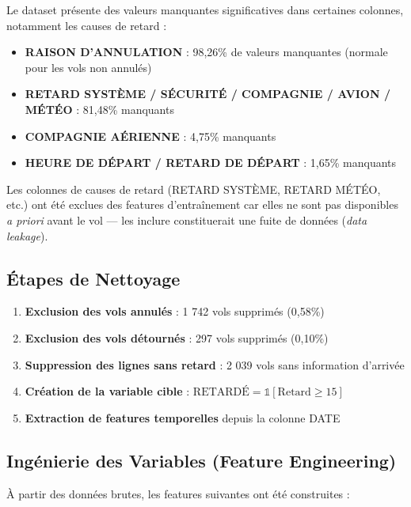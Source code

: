 \documentclass[12pt,a4paper]{article}
\begin{document}
Le dataset présente des valeurs manquantes significatives dans certaines colonnes,
notamment les causes de retard :

\begin{itemize}[leftmargin=*]
  \item \textbf{RAISON D'ANNULATION} : 98,26\% de valeurs manquantes (normale pour les vols non annulés)
  \item \textbf{RETARD SYSTÈME / SÉCURITÉ / COMPAGNIE / AVION / MÉTÉO} : 81,48\% manquants
  \item \textbf{COMPAGNIE AÉRIENNE} : 4,75\% manquants
  \item \textbf{HEURE DE DÉPART / RETARD DE DÉPART} : 1,65\% manquants
\end{itemize}

\begin{warningbox}
  Les colonnes de causes de retard (RETARD SYSTÈME, RETARD MÉTÉO, etc.) ont été 
  exclues des features d'entraînement car elles ne sont pas disponibles \textit{a priori} 
  avant le vol --- les inclure constituerait une fuite de données (\textit{data leakage}).
\end{warningbox}

\subsection{Étapes de Nettoyage}

\begin{enumerate}[leftmargin=*]
  \item \textbf{Exclusion des vols annulés} : 1 742 vols supprimés (0,58\%)
  \item \textbf{Exclusion des vols détournés} : 297 vols supprimés (0,10\%)
  \item \textbf{Suppression des lignes sans retard} : 2 039 vols sans information d'arrivée
  \item \textbf{Création de la variable cible} : $\text{RETARDÉ} = \mathbb{1}[\text{Retard} \geq 15]$
  \item \textbf{Extraction de features temporelles} depuis la colonne DATE
\end{enumerate}

\subsection{Ingénierie des Variables (Feature Engineering)}

À partir des données brutes, les features suivantes ont été construites :
\end{document}
